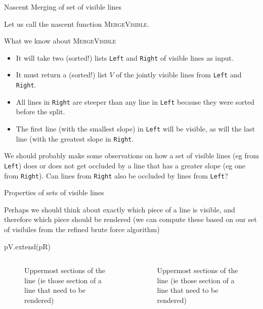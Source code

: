 \documentclass[ignorenonframetext,]{beamer}
\begin{document}
\begin{frame}{Nascent Merging of set of visible lines}

  Let us call the nascent function \textsc{MergeVisible}.

  \begin{block}{What we know about \textsc{MergeVisible}}
    \begin{itemize}
    \item It will take two (sorted!) lists \texttt{Left} and
      \texttt{Right} of visible lines as input. 
    \item It must return a (sorted!) list $V$ of the jointly visible
      lines from \texttt{Left} and \texttt{Right}.
    \item All lines in \texttt{Right} are steeper than any line in
      \texttt{Left} because they were sorted before the split.
    \item The first line (with the smallest slope) in \texttt{Left} will
      be visible, as will the last line (with the greatest slope in \texttt{Right}.
    \end{itemize}
  \end{block}

  We should probably make some observations on how a set of visible lines
  (eg from \texttt{Left}) does or does not get occluded by a line that
  has a greater slope (eg one from \texttt{Right}). Can lines from
  \texttt{Right} also be occluded by lines from \texttt{Left}?
\end{frame}


\begin{frame}[fragile]{Properties of sets of visible lines}

  Perhaps we should think about exactly which piece of a line is
  visible, and therefore which piece should be rendered (we can compute these based on our set of visibiles from the refined brute force algorithm)

  \begin{sympysilent}
    pV.extend(pR)
  \end{sympysilent}

  \begin{columns}
    \begin{column}{0.5\textwidth}
      \begin{figure}[H]
        \centering
        \caption{Uppermost sections of the line (ie those section of a line that need to be rendered)}
      \end{figure}
    \end{column}
    \begin{column}{0.5\textwidth}
      \begin{figure}[H]
        \centering

      \caption{Uppermost sections of the line (ie those section of a line that need to be rendered)}
    \end{figure}
  \end{column}
  \end{columns}

\end{frame}
\end{document}
